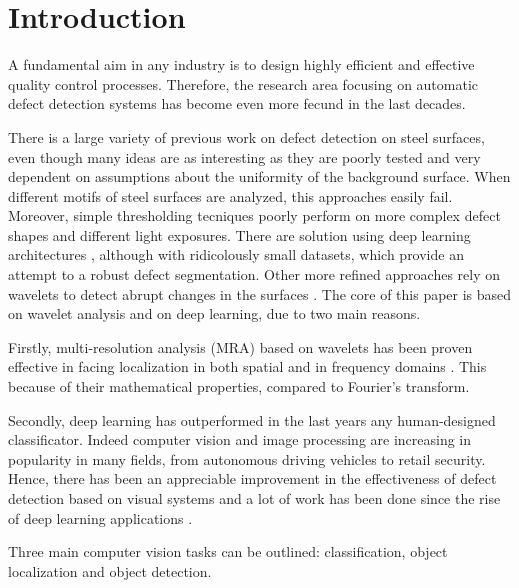 \section{Introduction}
    \par{
        A fundamental aim in any industry is to design highly efficient and effective quality control processes. Therefore, the research area focusing on automatic defect detection systems has become even more fecund in the last decades. 
    }
    \par{
        There is a large variety of previous work on defect detection on steel surfaces, even though many ideas \cite{ieee:4777721, ieee:7030439, ieee:8623728} are as interesting as they are poorly tested and very dependent on assumptions about the uniformity of the background surface. When different motifs of steel surfaces are analyzed, this approaches easily fail. Moreover, simple thresholding tecniques poorly perform on more complex defect shapes and different light exposures. There are solution using deep learning architectures \cite{ieee:1334512, ieee:6738559}, although with ridicolously small datasets, which provide an attempt to a robust defect segmentation. Other more refined approaches rely on wavelets to detect abrupt changes in the surfaces \cite{ieee:993164, ieee:6703333, ieee:7155940, sciencedirect:NGAN2011442}. The core of this paper is based on wavelet analysis and on deep learning, due to two main reasons.
    }
    \par{
        Firstly, multi-resolution analysis (MRA) based on wavelets has been proven effective in facing localization in both spatial and in frequency domains \cite{Vetterli:1995:WSC:201007, Daubechies:1992:TLW:130655, intechopen:bernardini}. This because of their mathematical properties, compared to Fourier's transform.
    }
    \par{
        Secondly, deep learning \cite{Goodfellow:2016:DL:3086952, Rojas:1996:NNS:235222} has outperformed in the last years any human-designed classificator. Indeed computer vision and image processing are increasing in popularity in many fields, from autonomous driving vehicles to retail security. Hence, there has been an appreciable improvement in the effectiveness of defect detection based on visual systems and a lot of work has been done since the rise of deep learning applications \cite{researchgate:deeplearning}.
    }
    \par{
        Three main computer vision tasks can be outlined: classification, object localization and object detection.
    }
